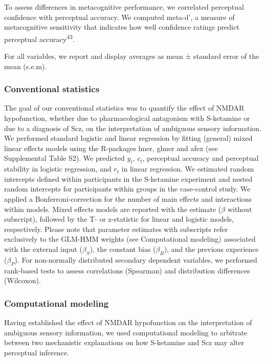 \documentclass[
]{article}
\begin{document}
To assess differences in metacognitive performance, we correlated
perceptual confidence with perceptual accuracy. We computed meta-d', a
measure of metacognitive sensitivity that indicates how well confidence
ratings predict perceptual accuracy\textsuperscript{43}.

For all variables, we report and display averages as mean ± standard
error of the mean (s.e.m).

\subsubsection{Conventional statistics}\label{conventional-statistics}

The goal of our conventional statistics was to quantify the effect of
NMDAR hypofunction, whether due to pharmacological antagonism with
S-ketamine or due to a diagnosis of Scz, on the interpretation of
ambiguous sensory information. We performed standard logistic and linear
regression by fitting (general) mixed linear effects models using the
R-packages lmer, glmer and afex (see Supplemental Table S2). We
predicted \(y_t\), \(c_t\), perceptual accuracy and perceptual stability
in logistic regression, and \(r_t\) in linear regression. We estimated
random intercepts defined within participants in the S-ketamine
experiment and nested random intercepts for participants within groups
in the case-control study. We applied a Bonferroni-correction for the
number of main effects and interactions within models. Mixed effects
models are reported with the estimate (\(\beta\) without subscript),
followed by the T- or z-statistic for linear and logistic models,
respectively. Please note that parameter estimates with subscripts refer
exclusively to the GLM-HMM weights (see Computational modeling)
associated with the external input (\(\beta_S\)), the constant bias
(\(\beta_B\)), and the previous experience (\(\beta_P\)). For
non-normally distributed secondary dependent variables, we performed
rank-based tests to assess correlations (Spearman) and distribution
differences (Wilcoxon).

\subsubsection{Computational modeling}\label{computational-modeling}

Having established the effect of NMDAR hypofunction on the
interpretation of ambiguous sensory information, we used computational
modeling to arbitrate between two mechanistic explanations on how
S-ketamine and Scz may alter perceptual inference.
\end{document}
